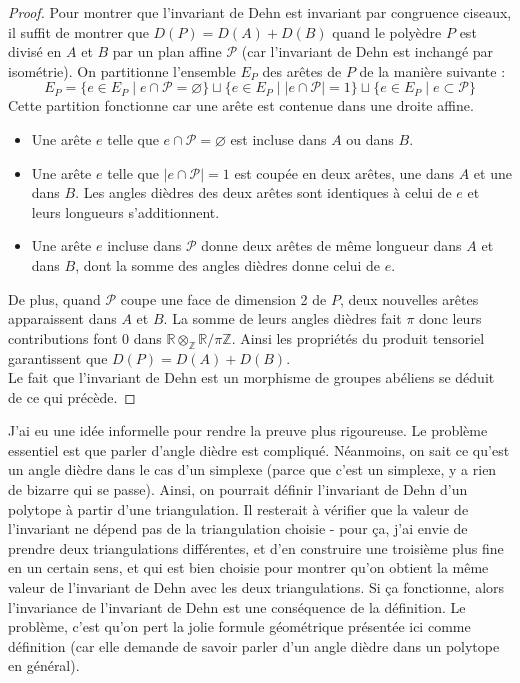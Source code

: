 \documentclass{article}
\newcommand{\Z}{\mathbb{Z}}
\newcommand{\R}{\mathbb{R}}
\renewcommand{\P}{\mathcal{P}}
\theoremstyle{plain}
\theoremstyle{definition}
\theoremstyle{remark}
\begin{document}
\begin{proof}
    Pour montrer que l'invariant de Dehn est invariant par congruence ciseaux, il suffit de montrer que $D(P) = D(A) + D(B)$ quand le polyèdre $P$ est divisé en $A$ et $B$ par un plan affine $\P$ (car l'invariant de Dehn est inchangé par isométrie). On partitionne l'ensemble $E_P$ des arêtes de $P$ de la manière suivante :
    \[E_P = \{e \in E_P \mid e \cap \P = \varnothing\} \sqcup \{e \in E_P \mid |e \cap \P| = 1\} \sqcup \{e \in E_P \mid e \subset \P\}\]
    Cette partition fonctionne car une arête est contenue dans une droite affine.
    \begin{itemize}
        \item Une arête $e$ telle que $e\cap \P = \varnothing$ est incluse dans $A$ ou dans $B$.
        \item Une arête $e$ telle que $|e\cap \P| = 1$ est coupée en deux arêtes, une dans $A$ et une dans $B$. Les angles dièdres des deux arêtes sont identiques à celui de $e$ et leurs longueurs s'additionnent.
        \item Une arête $e$ incluse dans $\P$ donne deux arêtes de même longueur dans $A$ et dans $B$, dont la somme des angles dièdres donne celui de $e$.
    \end{itemize}
    De plus, quand $\P$ coupe une face de dimension 2 de $P$, deux nouvelles arêtes apparaissent dans $A$ et $B$. La somme de leurs angles dièdres fait $\pi$ donc leurs contributions font $0$ dans $\R \otimes_\Z \R/\pi\Z$.
    Ainsi les propriétés du produit tensoriel garantissent que $D(P) = D(A)+ D(B)$. \\
    Le fait que l'invariant de Dehn est un morphisme de groupes abéliens se déduit de ce qui précède. 
\end{proof}

J'ai eu une idée informelle pour rendre la preuve plus rigoureuse. Le problème essentiel est que parler d'angle dièdre est compliqué. Néanmoins, on sait ce qu'est un angle dièdre dans le cas d'un simplexe (parce que c'est un simplexe, y a rien de bizarre qui se passe). Ainsi, on pourrait définir l'invariant de Dehn d'un polytope à partir d'une triangulation. Il resterait à vérifier que la valeur de l'invariant ne dépend pas de la triangulation choisie - pour ça, j'ai envie de prendre deux triangulations différentes, et d'en construire une troisième \og plus fine \fg en un certain sens, et qui est bien choisie pour montrer qu'on obtient la même valeur de l'invariant de Dehn avec les deux triangulations. Si ça fonctionne, alors l'invariance de l'invariant de Dehn est une conséquence de la définition. Le problème, c'est qu'on pert la jolie formule géométrique présentée ici comme définition (car elle demande de savoir parler d'un angle dièdre dans un polytope en général).
\end{document}
